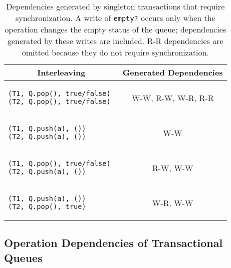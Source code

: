 \begin{table}[H]
    \singlespace
    \centering
    \begin{tabular}{|l|c|}
        \hline
        \multicolumn{1}{|c|}{Interleaving} & Generated Dependencies\\
        \hline

\begin{lstlisting}
(T1, Q.pop(), true/false) 
(T2, Q.pop(), true/false)
\end{lstlisting} &
W-W, R-W, W-R, R-R
       \\ 
    \hline
\begin{lstlisting}
(T1, Q.push(a), ())
(T2, Q.push(a), ())
\end{lstlisting} &
W-W
\\
\hline
\begin{lstlisting}
(T1, Q.pop(), true/false) 
(T2, Q.push(a), ()) 
\end{lstlisting} &
R-W, W-W
       \\ 
    \hline
\begin{lstlisting}
(T1, Q.push(a), ())
(T2, Q.pop(), true)
\end{lstlisting} &
W-R, W-W
\\
    \hline
\end{tabular}
    \caption[Dependencies generated by singleton transactions that require synchronization.]{Dependencies generated by singleton transactions that require synchronization. A write of \texttt{empty?} occurs only when the operation changes the empty status of the queue; dependencies generated by these writes are included. R-R dependencies are omitted because they do not require synchronization.
}
    \label{tab:queuesimpledeps}
\end{table}

\subsection{Operation Dependencies of Transactional Queues}

